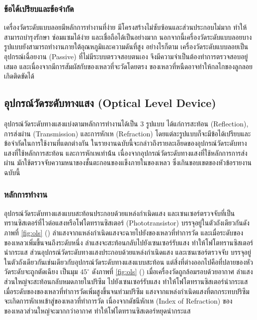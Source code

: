 \documentclass[final,11pt,a4paper]{article}
\begin{document}
\subsubsection{ข้อได้เปรียบและข้อจำกัด}
เครื่องวัดระดับแบบลอยมีหลักการทำงานที่ง่าย มีโครงสร้างไม่ซับซ้อนและส่วนประกอบไม่มาก ทำให้สามารถบำรุงรักษา ซ่อมแซมได้ง่าย และเชื่อถือได้เป็นอย่างมาก
นอกจากนี้เครื่องวัดระดับแบบลอยบางรูปแบบยังสามารถทำงานภายใต้อุณหภูมิและความดันที่สูง อย่างไรก็ตาม เครื่องวัดระดับแบบลอยเป็นอุปกรณ์เฉื่อยงาน (Passive) 
ที่ไม่มีระบบตรวจสอบตนเอง จึงมีความจำเป็นต้องทำการตรวจสอบอยู่เสมอ และเนื่องจากมีการสัมผัสกับของเหลวที่จะวัดโดยตรง ของเหลวที่หนืดอาจทำให้กลไกของลูกลอยเกิดติดขัดได้

\subsection{อุปกรณ์วัดระดับทางแสง (Optical Level Device)}
อุปกรณ์วัดระดับทางแสงแบ่งตามหลักการทำงานได้เป็น 3 รูปแบบ ได้แก่การสะท้อน (Reflection), การส่งผ่าน (Transmission) และการหักเห (Refraction) 
โดยแต่ละรูปแบบก็จะมีข้อได้เปรียบและข้อจำกัดในการใช้งานที่แตกต่างกัน ในรายงานฉบับนี้จะกล่าวถึงรายละเอียดของอุปกรณ์วัดระดับทางแสงที่ใช้หลักการสะท้อน 
และการหักเหเท่าน้้น เนื่องจากอุปกรณ์วัดระดับทางแสงที่ใช้หลักการการส่งผ่าน มักใช้ตรวจจับความหนาของชั้นตะกอนของแข็งภายในของเหลว 
ซึ่งเกินขอบเขตของหัวข้อรายงานฉบับนี้

\subsubsection{หลักการทำงาน}
อุปกรณ์วัดระดับทางแสงแบบสะท้อนประกอบด้วยแหล่งกำเนิดแสง และเซนเซอร์ตรวจจับที่เป็นทรานซิสเตอร์ที่ไวต่อแสงหรือโฟโตทรานซิสเตอร์ (Phototransistor) 
บรรจุอยู่ในตัวถังเดียวกันดังภาพที่ \ref{fig:ols} () ลำแสงจากแหล่งกำเนิดแสงจะฉายไปยังของเหลวที่ทำการวัด และเมื่อระดับของของเหลวเพิ่มขึ้นจนถึงระดับหนึ่ง 
ลำแสงจะสะท้อนกลับไปยังเซนเซอร์รับแสง ทำให้โฟโตทรานซิสเตอร์นำกระแส ส่วนอุปกรณ์วัดระดับทางแสงประกอบด้วยแหล่งกำเนิดแสง 
และเซนเซอร์ตรวจจับ บรรจุอยู่ในตัวถังเดียวกันเช่นเดียวกับอุปกรณ์วัดระดับทางแสงแบบสะท้อน แต่สิ่งที่ต่างออกไปคือที่ปลายของหัววัดระดับจะถูกตัดเฉียง
เป็นมุม $45^\circ$ ดังภาพที่ \ref{fig:ols} () เมื่อเครื่องวัดถูกล้อมรอบด้วยอากาศ ลำแสงส่วนใหญ่จะสะท้อนกลับหมดภายในปริซึม ไปยังเซนเซอร์รับแสง ทำให้โฟโตทรานซิสเตอร์นำกระแส
เมื่อระดับของของเหลวที่ทำการวัดเพิ่มสูงขึ้นจนท่วมปริซึม แสงจากแหล่งกำเนิดแสงที่ตกกระทบปริซึมจะเกิดการหักเหเข้าสู่ของเหลวที่ทำการวัด เนื่องจากดัชนีหักเห
(Index of Refraction) ของของเหลวส่วนใหญ่จะมากกว่าอากาศ ทำให้โฟโตทรานซิสเตอร์หยุดนำกระแส
\end{document}
